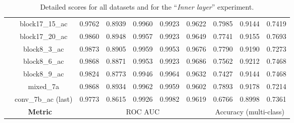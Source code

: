 \begin{table}
\begin{tabular}{|c|c|ccccc|ccc|}
    & block17\_15\_ac & 0.9762 & 0.8939 & 0.9960 & 0.9923 & 0.9622 & 0.7985 & 0.9144 & 0.7419 \\
    & block17\_20\_ac & 0.9860 & 0.8948 & 0.9957 & 0.9923 & 0.9649 & 0.7741 & 0.9155 & 0.7693 \\
    & block8\_3\_ac & 0.9873 & 0.8905 & 0.9959 & 0.9953 & 0.9676 & 0.7790 & 0.9190 & 0.7273 \\
    & block8\_6\_ac & 0.9868 & 0.8871 & 0.9953 & 0.9923 & 0.9686 & 0.7562 & 0.9212 & 0.7468 \\
    & block8\_9\_ac & 0.9824 & 0.8773 & 0.9946 & 0.9964 & 0.9632 & 0.7427 & 0.9144 & 0.7468 \\
    & mixed\_7a & 0.9868 & 0.8934 & 0.9962 & 0.9959 & 0.9602 & 0.7893 & 0.9178 & 0.7214 \\
    & conv\_7b\_ac (last) & 0.9773 & 0.8615 & 0.9926 & 0.9982 & 0.9619 & 0.6766 & 0.8998 & 0.7361 \\
    \hline
    \multicolumn{2}{|c|}{\textbf{Metric}} & \multicolumn{5}{c|}{ROC AUC} & \multicolumn{3}{c|}{Accuracy (multi-class)} \\
    \hline
  \end{tabular}
  \caption{Detailed scores for all datasets and for the ``\textit{Inner layer}'' experiment.}
  \label{app:comp:tab:detailed_second}
\end{table}

